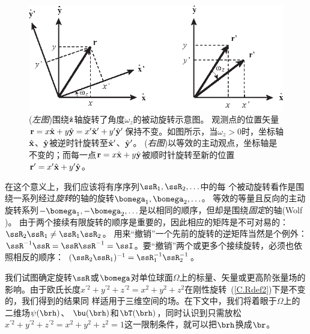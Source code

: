 \begin{figure}
\begin{center}
\includegraphics{../figures/appendixC/fig01.eps}
\end{center}
\caption[Active vs passive]{\label{C.fig.passrot}
({\em 左图\/})围绕$\hat{\bf z}$轴旋转了角度$\omega_z$的被动旋转示意图。
观测点的位置矢量${\bf r}=x\hat{\bf x}+y\hat{\bf y}
=x'\hat{\bf x}'+y'\hat{\bf y}'$保持不变。如图所示，当$\omega_z>0$时，坐标轴 $\hat{\bf x}$、$\hat{\bf y}$被逆时针旋转至$\hat{\bf x}'$、$\hat{\bf y}'$。
({\em 右图\/})以等效的主动观点，坐标轴是不变的；而每一点${\bf r}=x\hat{\bf x}+y\hat{\bf y}$被顺时针旋转至新的位置${\bf r}'=x'\hat{\bf x}+y'\hat{\bf y}$。}
\end{figure}
在这个意义上，我们应该将有序序列$\ssR_1,\ssR_2,\ldots$中的每
个被动旋转看作是围绕一系列经过{\em 旋转\/}的轴的旋转$\bomega_1,\bomega_2,\ldots$。
等效的等量且反向的主动旋转系列$-\bomega_1,-\bomega_2,\ldots$是以相同的顺序，但却是围绕{\em 固定\/}的轴(Wolf \citeyear{wolf69})。
由于两个接续有限旋转的顺序是重要的，因此相应的矩阵是不可对易的：$\ssR_2\ssR_1\neq\ssR_1\ssR_2$。
用来“撤销”一个先前的旋转的逆矩阵当然是个例外：$\ssR^{-1}\ssR=\ssR\ssR^{-1}=\ssI$。要“撤销”两个或更多个接续旋转，必须也依照相反的顺序： $(\ssR_2\ssR_1)^{-1}=\ssR_1^{-1}\ssR_2^{-1}$。

我们试图确定旋转$\ssR$或$\bomega$对单位球面$\Omega$上的标量、矢量或更高阶张量场的影响。由于欧氏长度$x^{\prime 2}+y^{\prime 2}+z^{\prime 2}
=x^2+y^2+z^2$在刚性旋转~(\ref{C.Rdef2})下是不变的，我们得到的结果同
样适用于三维空间的场。在下文中，我们将着眼于$\Omega$上的二维场$\psi(\brh)$、
$\bu(\brh)$和$\bT(\brh)$，同时认识到只需放松$x^{\prime 2}+y^{\prime 2}+z^{\prime 2}
=x^2+y^2+z^2=1$这一限制条件，就可以把$\brh$换成$\br$。

